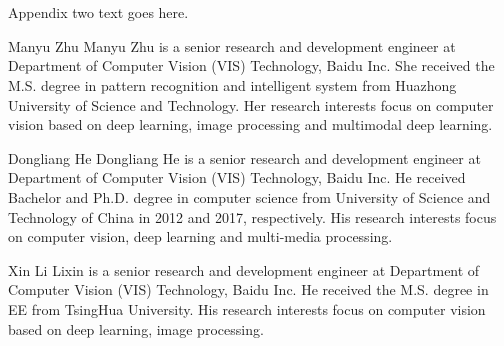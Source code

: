 \documentclass[journal]{IEEEtran}
\begin{document}
\section{}
Appendix two text goes here.
\fi




\ifCLASSOPTIONcaptionsoff
  \newpage
\fi














\iffalse
\begin{thebibliography}{1}

\bibitem{IEEEhowto:kopka}
H.~Kopka and P.~W. Daly, \emph{A Guide to \LaTeX}, 3rd~ed.\hskip 1em plus
  0.5em minus 0.4em\relax Harlow, England: Addison-Wesley, 1999.
@article{hays2007scene,
  title={Scene completion using millions of photographs},
  author={Hays, James and Efros, Alexei A},
  journal={ACM Transactions on Graphics},
  pages={4},
  year={2007},
}
\end{thebibliography}
\fi

\iftrue
\vspace{-40px}
\begin{IEEEbiography}{Manyu Zhu}
Manyu Zhu is a senior research and development engineer at Department of Computer Vision (VIS) Technology, Baidu Inc. She received the M.S. degree in pattern recognition and intelligent system from Huazhong University of Science and Technology. Her research interests focus on computer vision based on deep learning, image processing and multimodal deep learning.
\end{IEEEbiography}

\vspace{-60px}
\begin{IEEEbiography}{Dongliang He}
Dongliang He is a senior research and development engineer at Department of Computer Vision (VIS) Technology, Baidu Inc. He received Bachelor and  Ph.D. degree in computer science from University of Science and Technology of China in 2012 and 2017, respectively. His research interests focus on computer vision, deep learning and multi-media processing. 
\end{IEEEbiography}

\vspace{-60px}
\begin{IEEEbiography}{Xin Li}
Lixin is a senior research and development engineer at Department of Computer Vision (VIS) Technology, Baidu Inc. He received the M.S. degree in EE from TsingHua University. His research interests focus on computer vision based on deep learning, image processing.
\end{IEEEbiography}
\end{document}
